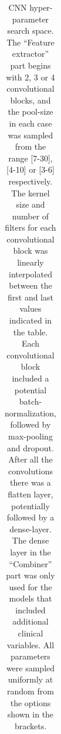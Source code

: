 \documentclass[preprint]{elsarticle}
\begin{document}
\begin{table}[H]
\begin{adjustbox}{center}
\begin{tabular}{@{}lr@{}}
\bottomrule
\end{tabular}
\end{adjustbox}
\caption{CNN hyper-parameter search space. The ``Feature extractor'' part begins with 2, 3 or 4 convolutional blocks, and the pool-size in each case was sampled from the range [7-30], [4-10] or [3-6] respectively. The kernel size and number of filters for each convolutional block was linearly interpolated between the first and last values indicated in the table. Each convolutional block included a potential batch-normalization, followed by max-pooling and dropout. After all the convolutions there was a flatten layer, potentially followed by a dense-layer. The dense layer in the ``Combiner'' part was only used for the models that included additional clinical variables. All parameters were sampled uniformly at random from the options shown in the brackets.}
\label{table:cnn}
\end{table}

\end{document}
